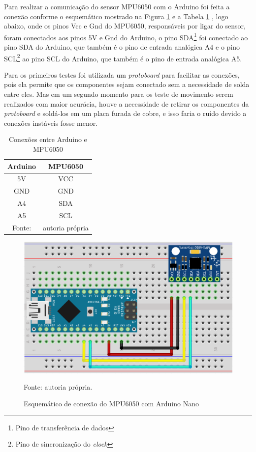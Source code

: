 		Para realizar a comunicação do sensor MPU6050 com o Arduino foi feita a conexão conforme o esquemático mostrado na Figura \ref{conexoes} e a Tabela \ref{conexoes_arduino} , logo abaixo, onde os pinos Vcc e Gnd do MPU6050, responsáveis por ligar do sensor, foram conectados aos pinos 5V e Gnd do Arduino, o pino SDA\footnote{Pino de transferência de dados} foi conectado ao pino SDA do Arduino, que também é o pino de entrada analógica A4 e o pino SCL\footnote{Pino de sincronização do \textit{clock}} ao pino SCL do Arduino, que também é o pino de entrada analógica A5.  
		
		Para os primeiros testes foi utilizada um \textit{protoboard} para facilitar as conexões, pois ela permite que os componentes sejam conectado sem a necessidade de solda entre eles. Mas em um segundo momento para os teste de movimento serem realizados com maior acurácia, houve a necessidade de retirar os componentes da \textit{protoboard} e soldá-los em um placa furada de cobre, e isso faria o ruído devido a conexões instáveis fosse menor.
		\begin{table}[h] \footnotesize
			\centering
			\caption{Conexões entre Arduino e MPU6050}
			\label{conexoes_arduino}
			
			\begin{tabular}{cc}
				\toprule
				\textbf{Arduino} & \textbf{MPU6050} \\
				\midrule
				5V & VCC \\
				GND & GND \\
				A4 & SDA \\
				A5 & SCL \\
				\bottomrule
				Fonte: & autoria própria
			\end{tabular}
		\end{table}
		
		\begin{figure}[h]
			\centering
			\includegraphics[keepaspectratio=true,scale=0.5]{figuras/conexoes_mpu_arduino.PNG}
			\caption{ Esquemático de conexão do MPU6050 com Arduino Nano }
			Fonte: autoria própria. \footnotesize
			\label{conexoes}	
		\end{figure}
		

